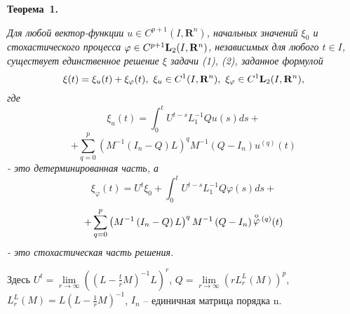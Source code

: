 \textbf{Теорема~1.} {\it
Для любой вектор-функции $u \in C^{p+1} (I ,{\mathbf R}^{n} )$, начальных значений $\xi _{0}$ и стохастического процесса $\varphi \in C^{p+1} {\bf L}_{2} (I ,{\mathbf R}^{n} )$, независимых для любого $t\in I $, существует единственное решение $\xi $ задачи (1), (2), заданное формулой
 $$
  \xi (t)=\xi_{u}(t)+\xi_{\varphi} (t), \ \xi_u \in C^{1}(I ,{\mathbf R}^{n}),\ \xi_{\varphi} \in C^{1} {\bf L}_{2} (I ,{\mathbf R}^{n} ),
  $$
где
$$
\xi_{u}(t)=\!\int _{0}^{t}U ^{t-s} L_{1}^{-1} Qu (s)ds+
$$
$$
+\sum _{q=0}^{p}\left(M^{-1} \left(I_{n} -Q\right)L\right)^{q} M^{-1} \left(Q-I_{n} \right)u^{(q)} (t)
$$
- это детерминированная часть, а
$$
\xi_{\varphi} (t)=U ^{t} \xi _{0} +\int _{0}^{t}U ^{t-s} L_{1}^{-1} Q\varphi (s)ds+
$$
$$
+\sum _{q=0}^{p}\left(M^{-1} \left(I_{n} -Q\right)L\right)^{q} M^{-1} \left(Q-I_{n} \right) \mathop{\varphi }\limits^{{\rm o}}{}^{(q)} (t)
$$
- это стохастическая часть решения.
	
	Здесь $U ^{t} =\lim \limits_{r \to \infty } \left( \left( L-{\frac{t}{r}} M\right)^{-1} L \right)^{r} $,
	$Q=\lim \limits_{r \to \infty} \left( rL_{r}^{L} (M) \right)^{p} $,
	$L_{r}^{L} (M) \! = \!\! L \! \left(L-{\frac{1}{r}} M \right)^{-1} \!\!$,
	 $I_{n} \!$ -- единичная матрица порядка n.
}


